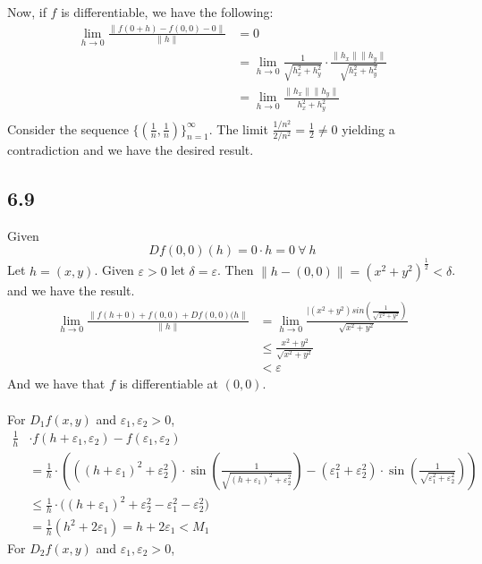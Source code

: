 \documentclass[letterpaper,12pt]{article}
\theoremstyle{definition}
\begin{document}
Now, if $f$ is differentiable, we have the following:
\begin{align*}
    \lim_{h\rightarrow 0} \frac{\| f(0 + h) - f(0,0) - 0 \|}{\| {h} \|} &= 0\\
    &= \lim_{h\rightarrow 0} \frac{1}{\sqrt{h_x^2 + h_y^2}}\cdot \frac{\|h_x\|\|h_y\|}{\sqrt{h_x^2 + h_y^2}} \\
    &= \lim_{h\rightarrow 0} \frac{\|h_x\|\|h_y\|}{h_x^2 + h_y^2} \\
\end{align*}
Consider the sequence $\{(\frac{1}{n},\frac{1}{n})\}_{n=1}^{\infty}$. The limit $\frac{1/n^2}{2/n^2} = \frac{1}{2} \neq 0$ yielding a contradiction and we have the desired result.

\subsection*{6.9}
Given
\[ Df(0,0)({h}) = {0} \cdot {h} = {0} ~ \forall ~ {h} \]
Let ${h} = (x,y)$. Given $\varepsilon > 0$ let $\delta = \varepsilon$. Then $\| {h} - (0,0) \| = (x^2 + y^2)^\frac{1}{2} < \delta$. and we have the result.
\begin{align*}
    \lim_{h\rightarrow 0} \frac{\| f({h} + {0}) + f(0,0) + Df(0,0)({h} \| }{\| {h} \| } 
    &=  \lim_{h\rightarrow 0} \frac{|(x^2 + y^2)sin\left( \frac{1}{\sqrt{x^2+y^2}} \right)}{\sqrt{x^2 + y^2}}\\
    & \leq \frac{x^2 + y^2}{\sqrt{x^2 + y^2}} \\&< \varepsilon
\end{align*}
And we have that $f$ is differentiable at $(0,0)$.\\
\\
For $D_1f(x,y)$ and $\varepsilon_1, \varepsilon_2 > 0$,
\begin{align*}
    \frac{1}{h} &\cdot f(h + \varepsilon_1, \varepsilon_2) - f(\varepsilon_1, \varepsilon_2)\\
    &= \frac{1}{h} \cdot \left( ( (h + \varepsilon_1)^2 + \varepsilon_2^2)\cdot \sin\left(\frac{1}{\sqrt{(h + \varepsilon_1)^2 + \varepsilon_2^2}}\right) - (\varepsilon_1^2 + \varepsilon_2^2)\cdot \sin\left(\frac{1}{\sqrt{\varepsilon_1^2 + \varepsilon_2^2}}\right) \right) \\
    & \leq \frac{1}{h} \cdot \big( (h + \varepsilon_1)^2 + \varepsilon_2^2 - \varepsilon_1^2 - \varepsilon_2^2 \big) \\
    &= \frac{1}{h}(h^2 +2\varepsilon_1) = h + 2\varepsilon_1 < M_1
\end{align*}
For $D_2f(x,y)$ and $\varepsilon_1, \varepsilon_2 > 0$, 
\end{document}
